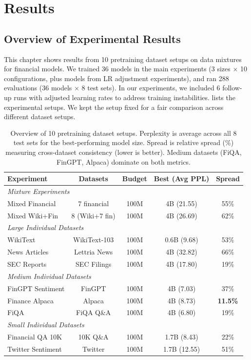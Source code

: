 \chapter{Results}

\section{Overview of Experimental Results}

This chapter shows results from 10 pretraining dataset setups on data mixtures for financial models. We trained 36 models in the main experiments (3 sizes $\times$ 10 configurations, plus models from LR adjustment experiments), and ran 288 evaluations (36 models $\times$ 8 test sets). In our experiments, we included 6 follow-up runs with adjusted learning rates to address training instabilities.  lists the experimental setups. We kept the setup fixed for a fair comparison across different dataset setups.

\begin{table}[htbp]
\centering
\small
\begin{tabular}{lcccc}
\toprule
\textbf{Experiment} & \textbf{Datasets} & \textbf{Budget} & \textbf{Best (Avg PPL)} & \textbf{Spread} \\
\midrule
\multicolumn{5}{l}{\textit{Mixture Experiments}} \\
Mixed Financial & 7 financial & 100M & 4B (21.55) & 55\% \\
Mixed Wiki+Fin & 8 (Wiki+7 fin) & 100M & 4B (26.69) & 62\% \\
\midrule
\multicolumn{5}{l}{\textit{Large Individual Datasets}} \\
WikiText & WikiText-103 & 100M & 0.6B (9.68) & 53\% \\
News Articles & Lettria News & 100M & 4B (32.82) & 66\% \\
SEC Reports & SEC Filings & 100M & 4B (17.80) & 19\% \\
\midrule
\multicolumn{5}{l}{\textit{Medium Individual Datasets}} \\
FinGPT Sentiment & FinGPT & 100M & 4B (7.03) & 37\% \\
Finance Alpaca & Alpaca & 100M & 4B (8.73) & \textbf{11.5\%} \\
FiQA & FiQA Q\&A & 100M & 4B (6.80) & 19\% \\
\midrule
\multicolumn{5}{l}{\textit{Small Individual Datasets}} \\
Financial QA 10K & 10K Q\&A & 100M & 1.7B (8.43) & 22\% \\
Twitter Sentiment & Twitter & 100M & 1.7B (12.55) & 51\% \\
\bottomrule
\end{tabular}
\caption[Overview of Pretraining Experiments]{Overview of 10 pretraining dataset setups. Perplexity is average across all 8 test sets for the best-performing model size. Spread is relative spread (\%) measuring cross-dataset consistency (lower is better). Medium datasets (FiQA, FinGPT, Alpaca) dominate on both metrics.}
\label{tab:experiments_overview}
\end{table}

